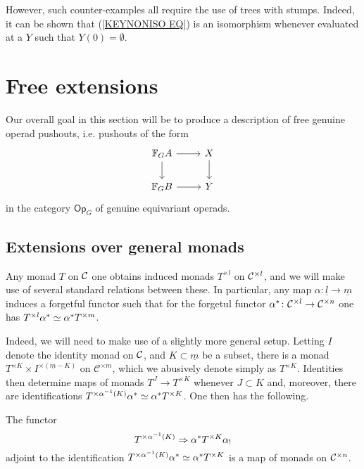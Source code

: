 \documentclass[a4paper,10pt]{article}%
\begin{document}
\begin{remark}
However, such counter-examples all require the use of trees with stumps. Indeed, it can be shown that (\ref{KEYNONISO EQ})
is an isomorphism whenever evaluated at a $Y$ such that $Y(0)=\emptyset$.
\end{remark}



\section{Free extensions}

Our overall goal in this section will be to produce a description of free genuine operad pushouts, i.e. pushouts of the form
\[
\begin{tikzcd}
	\mathbb{F}_G A \ar{r} \ar{d} & X \ar{d}
\\
	\mathbb{F}_G B \ar{r} & Y
\end{tikzcd}
\]
in the category $\mathsf{Op}_G$ of genuine equivariant operads.



\subsection{Extensions over general monads}\label{EXTGENMON SEC}

Any monad $T$ on $\mathcal{C}$ one obtains induced monads $T^{\times l}$ on $\mathcal{C}^{\times l}$, and we will make use of several standard relations between these.
In particular, any map $\alpha \colon \underline{l} \to \underline{m}$ induces a forgetful functor
such that for the forgetul functor 
$\alpha^{\**} \colon \C^{\times l} \to \C^{\times n}$
one has $T^{\times l} \alpha^{\**} \simeq  \alpha^{\**} T^{\times m}$.


Indeed, we will need to make use of a slightly more general setup. Letting $I$ denote the identity monad on $\mathcal{C}$, and $K \subset \underline{m}$ be a subset, there is a monad $T^{\times K} \times I^{\times(\underline{m}-K)}$ on $\mathcal{C}^{\times m}$, which we abusively denote simply as $T^{\times K}$. Identities then determine maps of monads 
$T^{J} \to T^{\times K}$ whenever $J \subset K$
and, moreover, there are identifications
$T^{\times \alpha^{-1}(K)} \alpha^{\**} \simeq \alpha^{\**} T^{\times K}$.
One then has the following.


\begin{proposition}\label{MONADICFUN PROP}
	The functor
\begin{equation}\label{MONADFUNCTORALPHA EQ}
	T^{\times \alpha^{-1} (K)} \Rightarrow \alpha^{\**} T^{\times K} \alpha_{!}
\end{equation}
adjoint to the identification 
$T^{\times \alpha^{-1} (K)} \alpha^{\**} \simeq \alpha^{\**} T^{\times K}$
is a map of monads on $\mathcal{C}^{\times n}$.
\end{proposition}
\end{document}
